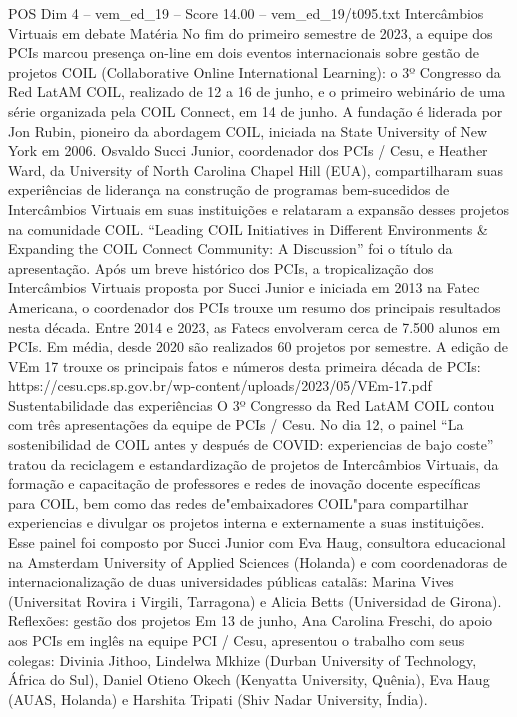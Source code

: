 \begin{textsample}{POS Dim 4 – vem\_ed\_19 – Score 14.00 – vem\_ed\_19/t095.txt}
Intercâmbios Virtuais em debate Matéria No fim do primeiro semestre de 2023, a equipe dos PCIs marcou presença on-line em dois eventos internacionais sobre gestão de projetos COIL (Collaborative Online International Learning): o 3º Congresso da Red LatAM COIL, realizado de 12 a 16 de junho, e o primeiro webinário de uma série organizada pela COIL Connect, em 14 de junho.
A fundação é liderada por Jon Rubin, pioneiro da abordagem COIL, iniciada na State University of New York em 2006.
Osvaldo Succi Junior, coordenador dos PCIs / Cesu, e Heather Ward, da University of North Carolina Chapel Hill (EUA), compartilharam suas experiências de liderança na construção de programas bem-sucedidos de Intercâmbios Virtuais em suas instituições e relataram a expansão desses projetos na comunidade COIL. “Leading COIL Initiatives in Different Environments \& Expanding the COIL Connect Community: A Discussion” foi o título da apresentação.
Após um breve histórico dos PCIs, a tropicalização dos Intercâmbios Virtuais proposta por Succi Junior e iniciada em 2013 na Fatec Americana, o coordenador dos PCIs trouxe um resumo dos principais resultados nesta década.
Entre 2014 e 2023, as Fatecs envolveram cerca de 7.500 alunos em PCIs.
Em média, desde 2020 são realizados 60 projetos por semestre.
A edição de VEm 17 trouxe os principais fatos e números desta primeira década de PCIs: https://cesu.cps.sp.gov.br/wp-content/uploads/2023/05/VEm-17.pdf Sustentabilidade das experiências O 3º Congresso da Red LatAM COIL contou com três apresentações da equipe de PCIs / Cesu.
No dia 12, o painel “La sostenibilidad de COIL antes y después de COVID: experiencias de bajo coste” tratou da reciclagem e estandardização de projetos de Intercâmbios Virtuais, da formação e capacitação de professores e redes de inovação docente específicas para COIL, bem como das redes de"embaixadores COIL"para compartilhar experiencias e divulgar os projetos interna e externamente a suas instituições.
Esse painel foi composto por Succi Junior com Eva Haug, consultora educacional na Amsterdam University of Applied Sciences (Holanda) e com coordenadoras de internacionalização de duas universidades públicas catalãs: Marina Vives (Universitat Rovira i Virgili, Tarragona) e Alicia Betts (Universidad de Girona).
Reflexões: gestão dos projetos Em 13 de junho, Ana Carolina Freschi, do apoio aos PCIs em inglês na equipe PCI / Cesu, apresentou o trabalho com seus colegas: Divinia Jithoo, Lindelwa Mkhize (Durban University of Technology, África do Sul), Daniel Otieno Okech (Kenyatta University, Quênia), Eva Haug (AUAS, Holanda) e Harshita Tripati (Shiv Nadar University, Índia).

\end{textsample}
